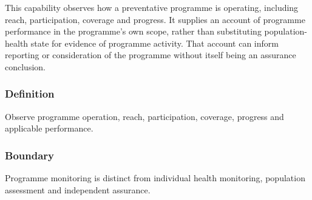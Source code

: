 This capability observes how a preventative programme is operating, including reach, participation, coverage and progress. It supplies an account of programme performance in the programme's own scope, rather than substituting population-health state for evidence of programme activity. That account can inform reporting or consideration of the programme without itself being an assurance conclusion.

\subsubsection*{Definition}

Observe programme operation, reach, participation, coverage, progress and applicable performance.

\subsubsection*{Boundary}

Programme monitoring is distinct from individual health monitoring, population assessment and independent assurance.

